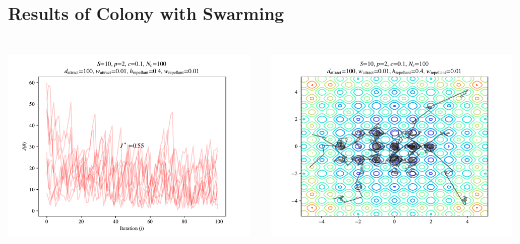 \documentclass{beamer}
\begin{document}
\begin{frame}
\frametitle{Results of Colony with Swarming}
\begin{columns}[T]
    \begin{center}
      \includegraphics[scale=0.35]{assets/rastrigin_colony_tuned_J}
    \end{center}
  \begin{center}
    \includegraphics[scale=0.35]{assets/rastrigin_colony_tuned_theta}
  \end{center}
\end{columns}
\end{frame}
\end{document}

